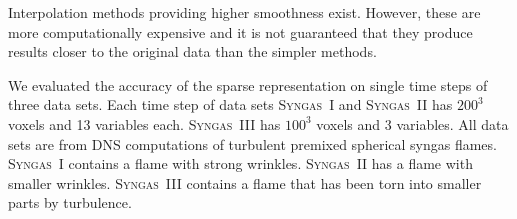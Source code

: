 %
Interpolation methods providing higher smoothness exist.
%
However, these are more computationally expensive and it is not guaranteed that
they produce results closer to the original data than the simpler methods.
%

%
We evaluated the accuracy of the sparse representation on single time steps of
three data sets.
%
Each time step of data sets \textsc{Syngas~I} and \textsc{Syngas~II} has
$\num{200}^3$ voxels and \num{13} variables each.
%
\textsc{Syngas~III} has $\num{100}^3$ voxels and \num{3} variables.
%
All data sets are from \ac{DNS} computations of turbulent premixed spherical
syngas flames.
%
\textsc{Syngas~I} contains a flame with strong wrinkles.
%
\textsc{Syngas~II} has a flame with smaller wrinkles.
%
\textsc{Syngas~III} contains a flame that has been torn into smaller parts by
turbulence.
%
%
%

